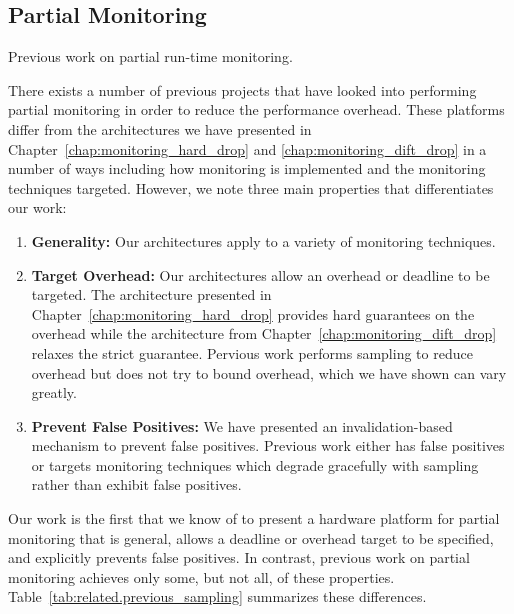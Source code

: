 \subsection{Partial Monitoring}

\begin{table}[tb]
  \begin{center}
    \begin{footnotesize}
    
    \end{footnotesize}
    \caption{Previous work on partial run-time monitoring.}
    \label{tab:related.previous_sampling}
  \end{center}
\end{table}

There exists a number of previous projects that have looked into performing
partial monitoring in order to reduce the performance overhead. These platforms
differ from the architectures we have presented in
Chapter~\ref{chap:monitoring_hard_drop} and \ref{chap:monitoring_dift_drop} in a
number of ways including how monitoring is implemented and the monitoring
techniques targeted. However, we note three main properties that differentiates
our work:
\begin{enumerate}
  \item \textbf{Generality:} Our architectures apply to a variety of
  monitoring techniques.
  \item \textbf{Target Overhead:} Our architectures allow an overhead or
  deadline to be targeted. The architecture presented in
  Chapter~\ref{chap:monitoring_hard_drop} provides hard guarantees on the
  overhead while the architecture from Chapter~\ref{chap:monitoring_dift_drop}
  relaxes the strict guarantee. Pervious work performs sampling to reduce overhead
  but does not try to bound overhead, which we have shown can vary greatly.
  \item \textbf{Prevent False Positives:} We have presented an
  invalidation-based mechanism to prevent false positives. Previous work either
  has false positives or targets monitoring techniques which degrade gracefully
  with sampling rather than exhibit false positives.
\end{enumerate}
Our work is the first that we know of to present a hardware platform for
partial monitoring that is general, allows a deadline or overhead target to be
specified, and explicitly prevents false positives. In contrast, previous work
on partial monitoring achieves only some, but not all, of these properties.
Table~\ref{tab:related.previous_sampling} summarizes these differences. 

